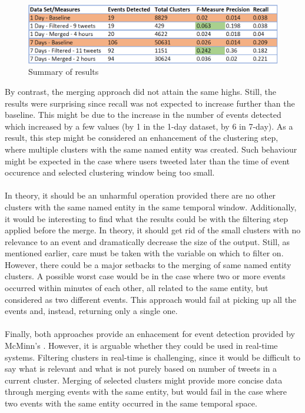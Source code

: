 \documentclass[a4paper,portrait,12pt]{article}
\begin{document}
\begin{figure}[h!]
	\centering
	\includegraphics[width=\linewidth]{images/summary.png}
	\caption{Summary of results}
	\label{fig:summary}
\end{figure}

By contrast, the merging approach did not attain the same highs.
Still, the results were surprising since recall was not expected to increase further than the baseline.
This might be due to the increase in the number of events detected which increased by a few values (by 1 in the 1-day dataset, by 6 in 7-day).
As a result, this step might be considered an enhancement of the clustering step, where multiple clusters with the same named entity was created. 
Such behaviour might be expected in the case where users tweeted later than the time of event occurence and selected clustering window being too small.
\\\\
In theory, it should be an unharmful operation provided there are no other clusters with the same named entity in the same temporal window.
Additionally, it would be interesting to find what the results could be with the filtering step applied before the merge.
In theory, it should get rid of the small clusters with no relevance to an event and dramatically decrease the size of the output. 
Still, as mentioned earlier, care must be taken with the variable on which to filter on.
\\
However, there could be a major setbacks to the merging of same named entity clusters.
A possible worst case would be in the case where two or more events occurred within minutes of each other, all related to the same entity, but considered as two different events. 
This approach would fail at picking up all the events and, instead, returning only a single one. 
\\\\
Finally, both approaches provide an enhacement for event detection provided by McMinn's \cite{McMinn2013}.
However, it is arguable whether they could be used in real-time systems.
Filtering clusters in real-time is challenging, since it would be difficult to say what is relevant and what is not purely based on number of tweets in a current cluster.
Merging of selected clusters might provide more concise data through merging events with the same entity, but would fail in the case where two events with the same entity occurred in the same temporal space.
\end{document}
